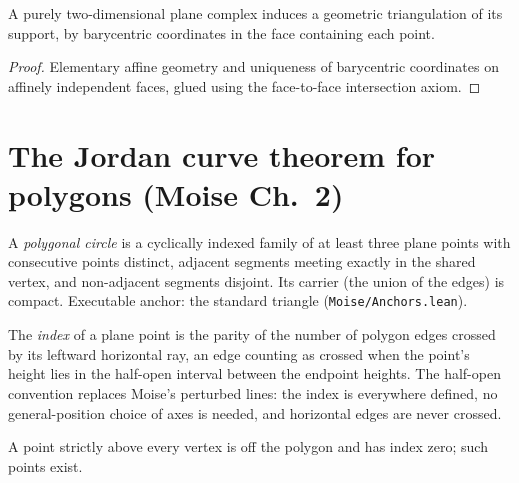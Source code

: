 \begin{lemma}
\label{moise:lem:plane_complex_realization}
\leanok
{}
A purely two-dimensional plane complex induces a geometric triangulation of its
support, by barycentric coordinates in the face containing each point.
\end{lemma}

\begin{proof}
\leanok
Elementary affine geometry and uniqueness of barycentric coordinates on
affinely independent faces, glued using the face-to-face intersection axiom.
\end{proof}

\section{The Jordan curve theorem for polygons (Moise Ch.~2)}

\begin{definition}
\label{moise:def:polygonal_circle}
\leanok
A \emph{polygonal circle} is a cyclically indexed family of at least three
plane points with consecutive points distinct, adjacent segments meeting
exactly in the shared vertex, and non-adjacent segments disjoint.  Its carrier
(the union of the edges) is compact.  Executable anchor: the standard triangle
(\texttt{Moise/Anchors.lean}).
\end{definition}

\begin{definition}
\label{moise:def:crossing_index}
\leanok
{}
The \emph{index} of a plane point is the parity of the number of polygon edges
crossed by its leftward horizontal ray, an edge counting as crossed when the
point's height lies in the half-open interval between the endpoint heights.
The half-open convention replaces Moise's perturbed lines: the index is
everywhere defined, no general-position choice of axes is needed, and
horizontal edges are never crossed.
\end{definition}

\begin{lemma}
\label{moise:lem:index_zero_high}
\leanok
{}
A point strictly above every vertex is off the polygon and has index zero; such
points exist.
\end{lemma}

